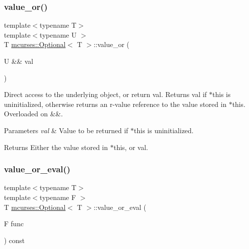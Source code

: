\subsubsection{\texorpdfstring{value\+\_\+or()}{value\_or()}\hspace{0.1cm}{\footnotesize\ttfamily [2/2]}}
{\footnotesize\ttfamily template$<$typename T$>$ \\
template$<$typename U $>$ \\
T \hyperlink{classmcurses_1_1Optional}{mcurses\+::\+Optional}$<$ T $>$\+::value\+\_\+or (\begin{DoxyParamCaption}\item[{U \&\&}]{val }\end{DoxyParamCaption})\hspace{0.3cm}{\ttfamily [inline]}}



Direct access to the underlying object, or return {\ttfamily val}. Returns {\ttfamily val} if $\ast$this is uninitialized, otherwise returns an r-\/value reference to the value stored in $\ast$this. Overloaded on \&\&. 


\begin{DoxyParams}{Parameters}
{\em val} & Value to be returned if $\ast$this is uninitialized. \\
\hline
\end{DoxyParams}
\begin{DoxyReturn}{Returns}
Either the value stored in $\ast$this, or {\ttfamily val}. 
\end{DoxyReturn}
\hypertarget{classmcurses_1_1Optional_aa5a4cbc8fd315e360e6fcb6dc4e55c07}{}\label{classmcurses_1_1Optional_aa5a4cbc8fd315e360e6fcb6dc4e55c07} 
\subsubsection{\texorpdfstring{value\+\_\+or\+\_\+eval()}{value\_or\_eval()}\hspace{0.1cm}{\footnotesize\ttfamily [1/2]}}
{\footnotesize\ttfamily template$<$typename T$>$ \\
template$<$typename F $>$ \\
T \hyperlink{classmcurses_1_1Optional}{mcurses\+::\+Optional}$<$ T $>$\+::value\+\_\+or\+\_\+eval (\begin{DoxyParamCaption}\item[{F}]{func }\end{DoxyParamCaption}) const\hspace{0.3cm}{\ttfamily [inline]}}



